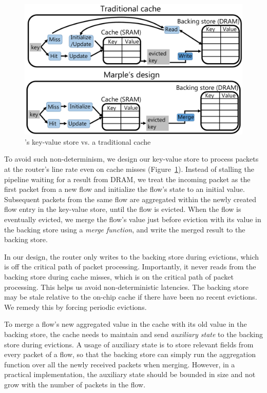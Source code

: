 \begin{figure}
\includegraphics[width=\columnwidth]{pq_kv_store.pdf}
\caption{\TheSystem's key-value store vs. a traditional cache}
\label{fig:kv}
\end{figure}

To avoid such non-determinism, we design our key-value store to process packets
at the router's line rate even on cache misses (Figure~\ref{fig:kv}). Instead
of stalling the pipeline waiting for a result from DRAM, we treat the incoming
packet as the first packet from a new flow and initialize the flow's state to
an initial value.  Subsequent packets from the same flow are aggregated within
the newly created flow entry in the key-value store, until the flow is evicted.
When the flow is eventually evicted, we merge the flow's value just before
eviction with its value in the backing store using a {\em merge function}, and
write the merged result to the backing store.

In our design, the router only writes to the backing store during evictions,
which is off the critical path of packet processing. Importantly, it never
reads from the backing store during cache misses, which is on the critical path
of packet processing. This helps us avoid non-deterministic latencies.  The
backing store may be stale relative to the on-chip cache if there have been no
recent evictions. We remedy this by forcing periodic evictions.

To merge a flow's new aggregated value in the cache with its old value in the
backing store, the cache needs to maintain and send {\em auxiliary state} to
the backing store during evictions.  A \naive usage of auxiliary state is to
store relevant fields from every packet of a flow, so that the backing store
can simply run the aggregation function over all the newly received packets when
merging.  However, in a practical implementation, the auxiliary state should be
bounded in size and not grow with the number of packets in the flow.

